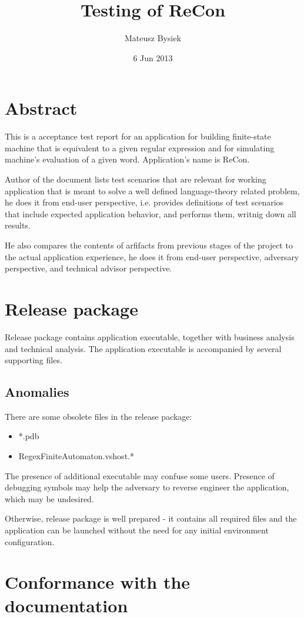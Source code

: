 \documentclass{article}
\title{Testing of ReCon}
\author{Mateusz Bysiek}
\date{6 Jun 2013}
\begin{document}


\section*{Abstract}

This is a acceptance test report for an application for building finite-state machine that is
equivalent to a given regular expression \newline and for simulating machine's evaluation of a given
word. Application's name is ReCon.

Author of the document lists test scenarios that are relevant for working
application that is meant to solve a well defined language\mbox{-}theory related problem, he does it
from end-user perspective, i.e. provides definitions of test scenarios that include expected
application behavior, and performs them, writnig down all results.

He also compares the contents of arfifacts from previous stages of the project to the actual
application experience, he does it from end-user perspective, adversary perspective, and technical
advisor perspective.

\section{Release package}
Release package contains application executable, together with business
analysis and technical analysis. The application executable is accompanied by several supporting
files.

\subsection{Anomalies}
There are some obsolete files in the release package:
\begin{itemize}%
  \item *.pdb
  \item RegexFiniteAutomaton.vshost.*
\end{itemize}

The presence of additional executable may confuse some users. Presence of debugging symbols may
help the adversary to reverse engineer the application, which may be undesired.

Otherwise, release package is well prepared - it contains all required files and the application can
be launched without the need for any initial environment configuration.

\section{Conformance with the documentation}
\end{document}
